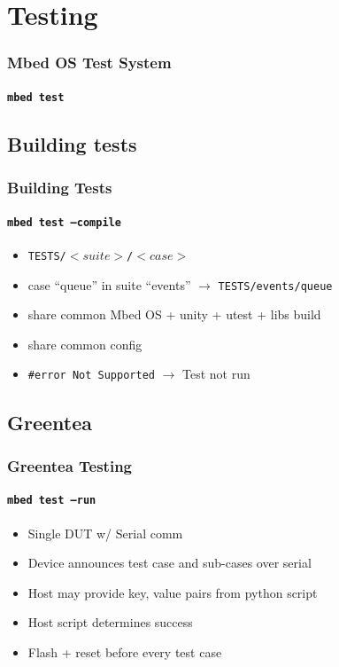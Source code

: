 \documentclass{beamer}
\begin{document}
\section{Testing}
\begin{frame}
  \frametitle{Mbed OS Test System}
  \framesubtitle{\texttt{mbed test}}
  \tableofcontents[currentsection]
\end{frame}
\subsection{Building tests}
\begin{frame}
  \frametitle{Building Tests}
  \framesubtitle{\texttt{mbed test --compile}}
  \begin{itemize}
    \item \texttt{TESTS/$<suite>$/$<case>$}
    \item case ``queue'' in suite ``events'' $\rightarrow$ \texttt{TESTS/events/queue}
    \item share common Mbed OS + unity + utest + libs build
    \item share common config
    \item \texttt{\#error Not Supported} $\rightarrow$ Test not run
  \end{itemize}
\end{frame}
\subsection{Greentea}
\begin{frame}
  \frametitle{Greentea Testing}
  \framesubtitle{\texttt{mbed test --run}}
  \begin{itemize}
  \item Single DUT w/ Serial comm
  \item Device announces test case and sub-cases over serial
  \item Host may provide key, value pairs from python script
  \item Host script determines success
  \item Flash + reset before every test case
  \end{itemize}
\end{frame}
\end{document}
